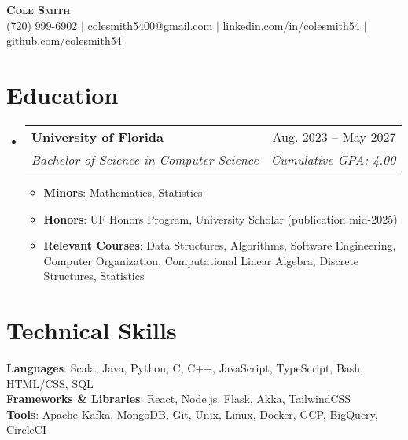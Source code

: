 \documentclass[letterpaper,12pt]{article}
\makeatletter
\newcommand{\resumeItem}[1]{
  \item\small{
    {#1 \vspace{-2pt}}
  }
}
\newcommand{\resumeSubheading}[4]{
  \vspace{-2pt}\item
    \begin{tabular*}{0.97\textwidth}[t]{l@{\extracolsep{\fill}}r}
      \textbf{#1} & #2 \\
      \textit{\small#3} & \textit{\small #4} \\
    \end{tabular*}\vspace{-7pt}
}
\newcommand{\resumeSubHeadingListStart}{\begin{itemize}[leftmargin=0.15in, label={}]}
\newcommand{\resumeSubHeadingListEnd}{\end{itemize}}
\newcommand{\resumeItemListStart}{\begin{itemize}}
\newcommand{\resumeItemListEnd}{\end{itemize}\vspace{-5pt}}
\makeatother
\begin{document}
\begin{center}
    \textbf{\Huge \scshape Cole Smith} \\ \vspace{1pt}
    \small (720) 999-6902 $|$ \href{mailto:colesmith5400@gmail.com}{\underline{colesmith5400@gmail.com}} $|$ 
    \href{https://linkedin.com/in/colesmith54}{\underline{linkedin.com/in/colesmith54}} $|$
    \href{https://github.com/colesmith54}{\underline{github.com/colesmith54}}
\end{center}


\section{Education}
  \resumeSubHeadingListStart
    \resumeSubheading
      {University of Florida}{Aug. 2023 -- May 2027}
      {Bachelor of Science in Computer Science}{Cumulative GPA: 4.00}
      \resumeItemListStart
        \resumeItem{\textbf{Minors}: Mathematics, Statistics}
        \resumeItem{\textbf{Honors}: {UF Honors Program, University Scholar (publication mid-2025)}}
        \resumeItem{\textbf{Relevant Courses}: Data Structures, Algorithms, Software Engineering, Computer Organization, Computational Linear Algebra, Discrete Structures, Statistics}
      \resumeItemListEnd
  \resumeSubHeadingListEnd

\section{Technical Skills}
 \begin{itemize}[leftmargin=0.15in, label={}]
    \small{\item{
     \textbf{Languages}{: Scala, Java, Python, C, C++, JavaScript, TypeScript, Bash, HTML/CSS, SQL} \\
     \textbf{Frameworks \& Libraries}{: React, Node.js, Flask, Akka, TailwindCSS} \\
     \textbf{Tools}{: Apache Kafka, MongoDB, Git, Unix, Linux, Docker, GCP, BigQuery, CircleCI} \\
    }}
 \end{itemize}
\end{document}
